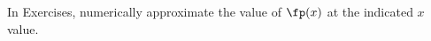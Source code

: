 \begin{exerciseset}{In Exercises}{, numerically approximate the value of $\fp(x)$ at the indicated $x$ value.}



\end{exerciseset}
